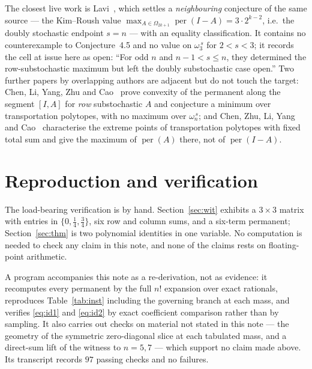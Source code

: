 \documentclass[11pt]{amsart}
\theoremstyle{remark}
\DeclareMathOperator{\per}{per}
\newcommand{\ws}{\omega}
\begin{document}
The closest live work is Lavi~\cite{lavi}, which settles a \emph{neighbouring}
conjecture of the same source --- the Kim--Roush value
$\max_{A\in\Omega_{2k+1}}\per(I-A)=3\cdot2^{k-2}$, i.e.\ the doubly stochastic
endpoint $s=n$ --- with an equality classification. It contains no counterexample to
Conjecture~4.5 and no value on $\ws_3^{\,s}$ for $2<s<3$; it records the cell at issue
here as open: ``For odd $n$ and $n-1<s\le n$, they determined the row-substochastic
maximum but left the doubly substochastic case open.'' Two further papers by
overlapping authors are adjacent but do not touch the target: Chen, Li, Yang, Zhu and
Cao~\cite{clyzc19} prove convexity of the permanent along the segment $[I,A]$ for
\emph{row} substochastic $A$ and conjecture a minimum over transportation polytopes,
with no maximum over $\ws_n^{\,s}$; and Chen, Zhu, Li, Yang and Cao~\cite{czlyc21}
characterise the extreme points of transportation polytopes with fixed total sum and
give the maximum of $\per(A)$ there, not of $\per(I-A)$.

\section{Reproduction and verification}\label{sec:repro}

The load-bearing verification is by hand. Section~\ref{sec:wit} exhibits a
$3\times3$ matrix with entries in $\{0,\tfrac14,\tfrac34\}$, six row and column sums,
and a six-term permanent; Section~\ref{sec:thm} is two polynomial identities in one
variable. No computation is needed to check any claim in this note, and none of the
claims rests on floating-point arithmetic.

A program accompanies this note as a re-derivation, not as evidence: it recomputes every
permanent by the full $n!$ expansion over exact rationals, reproduces
Table~\ref{tab:inst} including the governing branch at each mass, and verifies
\eqref{eq:id1} and \eqref{eq:id2} by exact coefficient comparison rather than by
sampling. It also carries out checks on material not stated in this note --- the
geometry of the symmetric zero-diagonal slice at each tabulated mass, and a direct-sum
lift of the witness to $n=5,7$ --- which support no claim made above. Its transcript
records $97$ passing checks and no failures.
\end{document}

